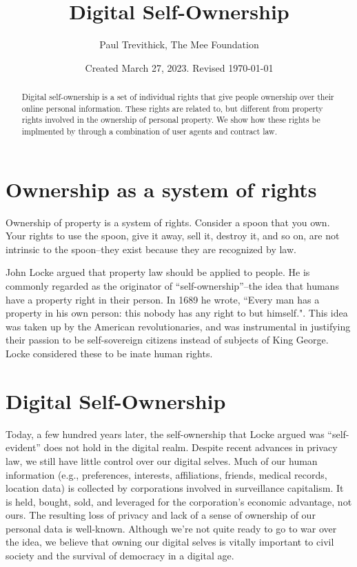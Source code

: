 \documentclass[11pt, oneside]{article}   	%
\title{Digital Self-Ownership}
\author{Paul Trevithick, The Mee Foundation}
\date{Created March 27, 2023. Revised \today}
\begin{document}
\maketitle
\begin{abstract}
	Digital self-ownership is a set of individual rights that give people ownership over their online personal information. These rights are related to, but different from property rights involved in the ownership of personal property. We show how these rights be implmented by through a combination of user agents and contract law.
\end{abstract}

\section{Ownership as a system of rights}
Ownership of property is a system of rights. Consider a spoon that you own. Your rights to use the spoon, give it away, sell it, destroy it, and so on, are not intrinsic to the spoon--they exist because they are recognized by law.

John Locke argued that property law should be applied to people. He is commonly regarded as the originator of ``self-ownership''--the idea that humans have a property right in their person. In 1689 he wrote, ``Every man has a property in his own person: this nobody has any right to but himself."\cite{Locke1689}. This idea was taken up by the American revolutionaries, and was instrumental in justifying their passion to be self-sovereign citizens instead of subjects of King George. Locke considered these to be inate human rights.

\section{Digital Self-Ownership}

Today, a few hundred years later, the self-ownership that Locke argued was “self-evident” does not hold in the digital realm. Despite recent advances in privacy law, we still have little control over our digital selves. Much of our human information (e.g., preferences, interests, affiliations, friends, medical records, location data) is collected by corporations involved in surveillance capitalism\cite{zuboff2019}. It is held, bought, sold, and leveraged for the corporation’s economic advantage, not ours. The resulting loss of privacy and lack of a sense of ownership of our personal data is well-known. Although we're not quite ready to go to war over the idea, we believe that owning our digital selves is vitally important to civil society and the survival of democracy in a digital age. 
\end{document}
